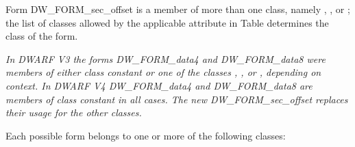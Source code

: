 Form DW\-\_FORM\-\_sec\-\_offset is a member of more than one class,
namely , ,  or ; the list
of classes allowed by the applicable attribute in 
Table 
determines the class of the form.

\textit{In DWARF V3 the forms DW\-\_FORM\-\_data4 and DW\-\_FORM\-\_data8 were
members of either class constant or one of the classes ,
,  or , depending on context. In
DWARF V4 DW\-\_FORM\-\_data4 and DW\-\_FORM\-\_data8 are members of class
constant in all cases. The new DW\-\_FORM\-\_sec\-\_offset replaces
their usage for the other classes.}

Each possible form belongs to one or more of the following classes:

